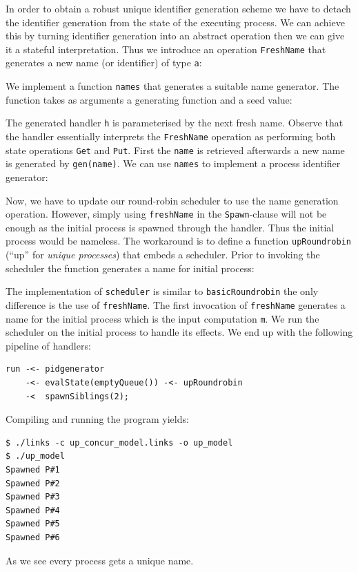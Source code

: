 \documentclass[12pt,mscres,cdtppar,twoside,openright,logo,rightchapter,normalheadings]{infthesis}
\newcommand{\snippet}[1]{}
\theoremstyle{definition}
\begin{document}
In order to obtain a robust unique identifier generation scheme we
have to detach the identifier generation from the state of the
executing process. We can achieve this by turning identifier
generation into an abstract operation then we can give it a stateful
interpretation. Thus we introduce an operation \lstinline$FreshName$
that generates a new name (or identifier) of type \lstinline$a$:
%
\snippet{freshname.links}
%
We implement a function \lstinline$names$ that generates a suitable
name generator. The function takes as arguments a generating function
and a seed value:
%
\snippet{freshnames.links}
%
The generated handler \lstinline$h$ is parameterised by the next fresh
name. Observe that the handler essentially interprets the
\lstinline$FreshName$ operation as performing both state operations
\lstinline$Get$ and \lstinline$Put$. First the \lstinline$name$ is
retrieved afterwards a new name is generated by
\lstinline$gen(name)$. We can use \lstinline$names$ to implement a
process identifier generator:
%
\snippet{pidgenerator.links}
%
Now, we have to update our round-robin scheduler to use the name
generation operation. However, simply using \lstinline$freshName$ in
the \lstinline$Spawn$-clause will not be enough as the initial process
is spawned through the handler. Thus the initial process would be
nameless. The workaround is to define a function
\lstinline$upRoundrobin$ (``up'' for \emph{unique processes}) that
embeds a scheduler. Prior to invoking the scheduler the function
generates a name for initial process:
%

%
The implementation of \lstinline$scheduler$ is similar to
\lstinline$basicRoundrobin$ the only difference is the use of
\lstinline$freshName$. The first invocation of \lstinline$freshName$
generates a name for the initial process which is the input
computation \lstinline$m$. We run the scheduler on the initial process
to handle its effects. We end up with the following pipeline of
handlers:
%
\begin{lstlisting}
run -<- pidgenerator 
    -<- evalState(emptyQueue()) -<- upRoundrobin 
    -<  spawnSiblings(2);
\end{lstlisting}
%
Compiling and running the program yields:
%
\begin{lstlisting}[style=terminal]
$ ./links -c up_concur_model.links -o up_model
$ ./up_model
Spawned P#1
Spawned P#2
Spawned P#3
Spawned P#4
Spawned P#5
Spawned P#6
\end{lstlisting}
%
As we see every process gets a unique name.
\end{document}
